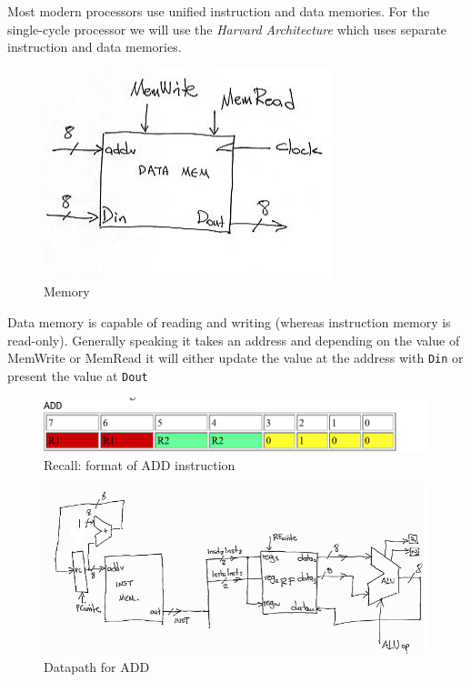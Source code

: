 \documentclass[../notes.tex]{subfiles}
\begin{document}
Most modern processors use unified instruction and data memories. For the single-cycle processor we will use the \textit{Harvard Architecture} which uses separate instruction and data memories.


\begin{figure}[H]
	\centering
	\includegraphics[width=0.8\linewidth]{img/image_2022-12-10-15-56-13.png}
	\caption{Memory}
\end{figure}

Data memory is capable of reading and writing (whereas instruction memory is read-only). Generally speaking it takes an address and depending on the value of MemWrite or MemRead it will either update the value at the address with \texttt{Din} or present the value at \texttt{Dout}



\begin{figure}[H]
	\centering
	\includegraphics[width=0.8\linewidth]{img/image_2022-12-10-15-58-01.png}
	\caption{Recall: format of ADD instruction}
\end{figure}



\begin{figure}[H]
	\centering
	\includegraphics[width=0.8\linewidth]{img/image_2022-12-10-16-18-18.png}
	\caption{Datapath for ADD}
\end{figure}
\end{document}
